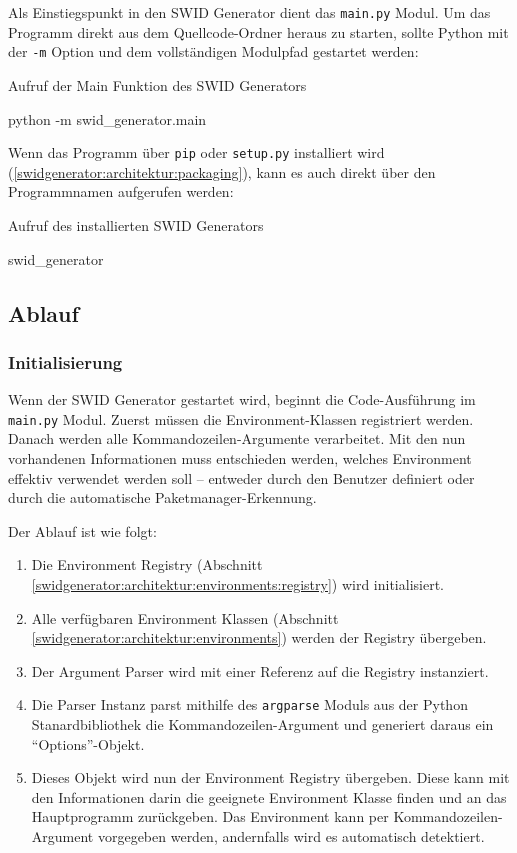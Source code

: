 Als Einstiegspunkt in den SWID Generator dient das \texttt{main.py} Modul. Um
das Programm direkt aus dem Quellcode-Ordner heraus zu starten, sollte Python
mit der \texttt{-m} Option und dem vollständigen Modulpfad gestartet werden:

\begin{listing}[H]
\caption{Aufruf der Main Funktion des SWID Generators}
\begin{bashcode}
python -m swid_generator.main
\end{bashcode}
\end{listing}

Wenn das Programm über \texttt{pip} oder \texttt{setup.py} installiert wird (\autoref{swidgenerator:architektur:packaging}), kann es auch direkt
über den Programmnamen aufgerufen werden:

\begin{listing}[H]
\caption{Aufruf des installierten SWID Generators}
\begin{bashcode}
swid_generator
\end{bashcode}
\end{listing}

\subsection{Ablauf}

\subsubsection{Initialisierung}
\label{swidgenerator:architektur:initialisierung}

Wenn der SWID Generator gestartet wird, beginnt die Code-Ausführung im
\texttt{main.py} Modul. Zuerst müssen die Environment-Klassen registriert werden. Danach werden alle
Kommandozeilen-Argumente verarbeitet. Mit den nun vorhandenen Informationen muss
entschieden werden, welches Environment effektiv verwendet werden soll --
entweder durch den Benutzer definiert oder durch die automatische
Paketmanager-Erkennung.

Der Ablauf ist wie folgt:

\begin{enumerate}
	\item Die Environment Registry
		(Abschnitt \ref{swidgenerator:architektur:environments:registry}) wird initialisiert.
	\item Alle verfügbaren Environment Klassen
		(Abschnitt \ref{swidgenerator:architektur:environments}) werden der Registry
		übergeben.
	\item Der Argument Parser wird mit einer Referenz auf die Registry instanziert.
	\item Die Parser Instanz parst mithilfe des \texttt{argparse} Moduls aus der
		Python Stanardbibliothek die Kommandozeilen-Argument und generiert daraus ein
		\enquote{Options}-Objekt. \item Dieses Objekt wird nun der Environment Registry
		übergeben. Diese kann mit den Informationen darin die geeignete Environment
		Klasse finden und an das Hauptprogramm zurückgeben. Das Environment kann per
		Kommandozeilen-Argument vorgegeben werden, andernfalls wird es automatisch
		detektiert.
\end{enumerate}

